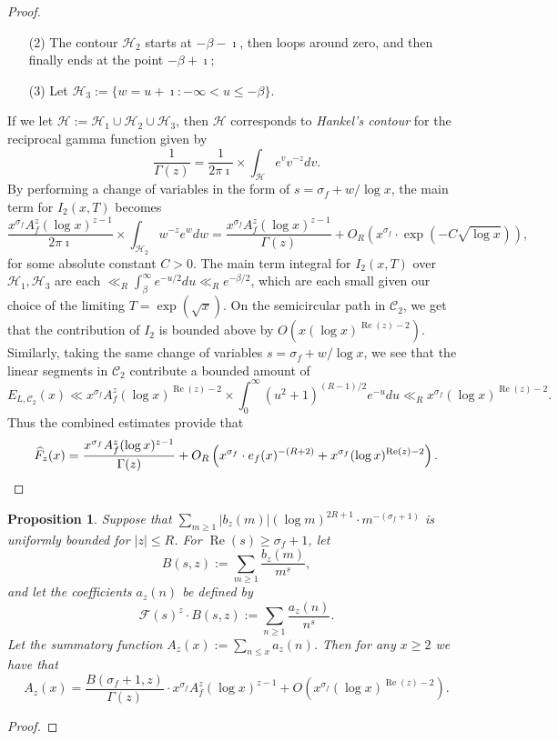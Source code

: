 \documentclass[11pt,reqno,a4letter]{article}
\numberwithin{figure}{section}
\numberwithin{table}{section}
\theoremstyle{plain}
\newtheorem{prop}[theorem]{Proposition}
\numberwithin{theorem}{section}
\theoremstyle{definition}
\renewcommand{\Re}{\operatorname{Re}}
\begin{document}
\begin{proof}
\begin{itemize}
\item[(2)] The contour $\mathcal{H}_2$ starts at $-\beta-\imath$, then loops around zero, and 
     then finally ends at the point $-\beta+\imath$; 
\item[(3)] Let $\mathcal{H}_3 := \{w=u+\imath: -\infty < u \leq -\beta\}$. 
\end{itemize}
If we let $\mathcal{H} := \mathcal{H}_1 \cup \mathcal{H}_2 \cup \mathcal{H}_3$, then 
$\mathcal{H}$ corresponds to \emph{Hankel's contour} for the reciprocal gamma function given by 
\[
\frac{1}{\Gamma(z)} = \frac{1}{2\pi\imath} \times \int_{\mathcal{H}} e^{v} v^{-z} dv. 
\]
By performing a change of variables in the form of $s = \sigma_f + w / \log x$, the main term 
for $I_2(x, T)$ becomes 
\[
\frac{x^{\sigma_f} A_f^{z} (\log x)^{z-1}}{2\pi\imath} \times \int_{\mathcal{H}_2} w^{-z} e^{w} dw = 
     \frac{x^{\sigma_f} A_f^{z} (\log x)^{z-1}}{\Gamma(z)} + 
     O_{R}\left(x^{\sigma_f} \cdot \exp\left(-C \sqrt{\log x}\right)\right), 
\]
for some absolute constant $C > 0$. The main term integral for $I_2(x, T)$ over 
$\mathcal{H}_1,\mathcal{H}_3$ are each $\ll_R \int_{\beta}^{\infty} e^{-u/2} du \ll_R e^{-\beta/2}$, 
which are each small given our choice of the limiting $T = \exp\left(\sqrt{x}\right)$. 
On the semicircular path in $\mathcal{C}_2$, we get that the contribution of $I_2$ is 
bounded above by $O(x (\log x)^{\Re(z) - 2})$. Similarly, taking the same change of variables 
$s = \sigma_f + w/\log x$, we see that the linear segments in $\mathcal{C}_2$ contribute a 
bounded amount of 
\[
E_{L,\mathcal{C}_2}(x) \ll x^{\sigma_f} A_f^{z} (\log x)^{\Re(z)-2} \times \int_0^{\infty} 
     (u^2+1)^{(R-1)/2} e^{-u} du \ll_{R} x^{\sigma_f} (\log x)^{\Re(z)-2}. 
\]
Thus the combined estimates provide that 
\[
\widehat{F}_z(x) = \frac{x^{\sigma_f} A_f^{z} (\log x)^{z-1}}{\Gamma(z)} + O_R\left( 
     x^{\sigma_f} \cdot e_f(x)^{-(R+2)} + x^{\sigma_f} (\log x)^{\Re(z)-2}\right). \qedhere
\]
\end{proof}

\begin{prop}
\label{prop_Dzx_GenToFzx_lemma_formula_v1}
Suppose that $\sum_{m \geq 1} |b_z(m)| (\log m)^{2R+1} \cdot m^{-(\sigma_f+1)}$ is 
uniformly bounded for $|z| \leq R$. For $\Re(s) \geq \sigma_f + 1$, let 
\[
B(s, z) := \sum_{m \geq 1} \frac{b_z(m)}{m^s}, 
\]
and let the coefficients $a_z(n)$ be defined by 
\[
\mathcal{F}(s)^{z} \cdot B(s, z) := \sum_{n \geq 1} \frac{a_z(n)}{n^s}. 
\]
Let the summatory function $A_z(x) := \sum_{n \leq x} a_z(n)$. Then for any 
$x \geq 2$ we have that 
\[
A_z(x) = \frac{B(\sigma_f+1, z)}{\Gamma(z)} \cdot x^{\sigma_f} A_f^z (\log x)^{z-1} + O\left( 
     x^{\sigma_f} (\log x)^{\Re(z) - 2}\right). 
\]
\end{prop}
\begin{proof}
\end{proof}
\end{document}
